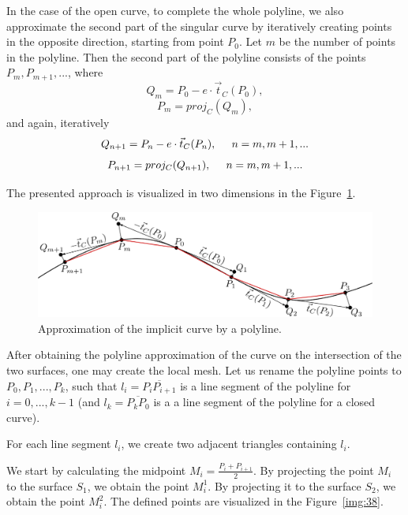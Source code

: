 In the case of the open curve, to complete the whole polyline, we also approximate 
the second part of the singular curve by iteratively creating points in the 
opposite direction, starting from point $P_0$. Let $m$ be the number of points
in the polyline. Then the second part of the polyline consists of the points
$P_m, P_{m+1}, ...$, where
$$Q_m = P_0 - e \cdot \vec{t}_C(P_0),$$
$$P_m = proj_C(Q_m),$$
and again, iteratively
$$Q_{n+1} = P_n - e \cdot \vec{t}_C(P_{n}), \hspace{5mm} n = m, m+1, ...$$
$$P_{n+1} = proj_C(Q_{n+1}), \hspace{5mm} n = m, m+1, ...$$

The presented approach is visualized in two dimensions in the Figure~\ref{img:37}.

\begin{figure}
    \centerline{\includegraphics[scale=0.5]{images/img37}}
    \caption[Approximation of the implicit curve by polyline]
    {Approximation of the implicit curve by a polyline.}
    \label{img:37}
\end{figure}

After obtaining the polyline approximation of the curve on the intersection
of the two surfaces, one may create the local mesh. Let us rename the polyline 
points to $P_0, P_1, ..., P_k$, such that $l_i = \overline{P_i P_{i+1}}$ is a 
line segment of the polyline for $i=0, ..., k-1$ (and $l_k = \overline{P_k P_0}$ is a 
a line segment of the polyline for a closed curve).

For each line segment $l_i$, we create two adjacent triangles containing $l_i$.

We start by calculating the midpoint $M_i = \frac{P_i+P_{i+1}}{2}$.
By projecting the point $M_i$ to the surface $S_1$, we obtain the point $M_i^1$.
By projecting it to the surface $S_2$, we obtain the point $M_i^2$. The defined points
are visualized in the Figure~\ref{img:38}.


